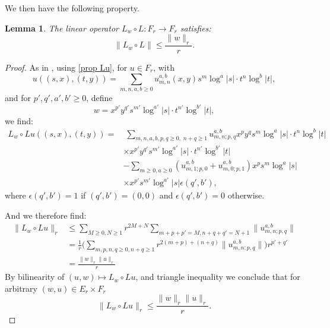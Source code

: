 \documentclass[12pt]{article}
\newtheorem{lem}[thm]{Lemma}
\begin{document}
    
    We then have the following property.
    
    \begin{lem}\label{control Lw o L}
        The linear operator $L_w\circ L : F_r\to F_r$ satisfies: $$\|L_w\circ L\|\leqslant \frac{\|w\|_r}{r}.$$
    \end{lem}
    \begin{proof}
        As in \cite{bt}, using \eqref{prop Lu}, for $u\in F_r$, with
        $$ u\left((s,x),(t,y)\right) = \sum_{m,n,a,b\geqslant 0} u_{m,n}^{a,b}(x,y)s^m\log^a|s|\cdot t^n\log^b|t|,$$
        and for $p',q',a',b'\geqslant0$, define
        $$w = x^{p'}y^{q'} s^{m'}\log^{a'}|s|\cdot t^{n'}\log^{b'}|t|,$$
        we find:
        \begin{align*}
            L_w\circ L u\left((s,x),(t,y)\right) =&\;\sum_{m,n,a,b,p,q\geqslant 0,\; n+q\geqslant1} u_{m,n;p,q}^{a,b} x^py^qs^m\log^a|s|\cdot
             t^n\log^b|t|\\&\times x^{p'}y^{q'} s^{m'}\log^{a'}|s|\cdot t^{n'}\log^{b'}|t|\\
            &- \sum_{m\geqslant 0,a \geqslant 0}(u_{m,1;p,0}^{a,b}+u_{m,0;p,1}^{a,b})x^ps^m\log^a|s|\\
            &\times x^{p'} s^{m'}\log^{a'}|s|\epsilon(q',b'),
        \end{align*}
       where $\epsilon(q',b') = 1$ if $(q',b') = (0,0)$ and $\epsilon(q',b') = 0$ otherwise.
       
        And we therefore find: 
        \begin{align*}
            \|L_w \circ L u\|_r &\leqslant \sum_{M\geqslant 0, N\geqslant 1} r^{2M+N}\sum_{m+p+p' = M , n+q+q'=N+1} \| u_{m,n;p,q}^{a,b}\|\\
            &=\frac{1}{r} \Big( \sum_{m,p,n,q\geqslant 0, n+q\geqslant 1} r^{2(m+p)+(n+q)} \| u_{m,n;p,q}^{a,b} \| \Big)r^{p'+q'}\\
            &= \frac{\|w\|_r\|u\|_r}{r} 
        \end{align*}
        By bilinearity of $ (u,w)\mapsto L_w\circ L u $, and triangle inequality we conclude that for arbitrary $(w,u)\in E_r\times F_r$
        $$\|L_w\circ L u\|_r \leqslant \frac{\|w\|_r\|u\|_r}{r}.$$
    \end{proof}
    
\end{document}
